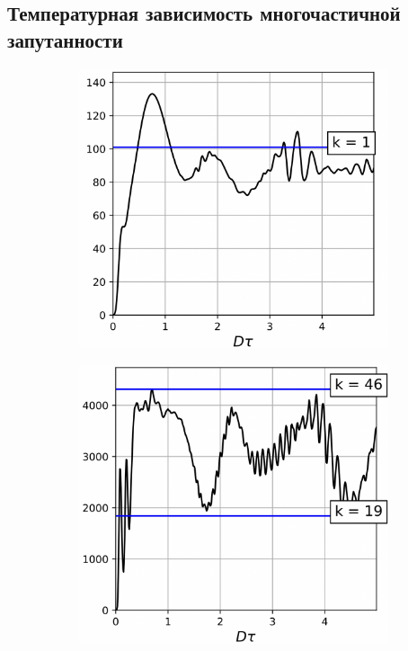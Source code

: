 \subsection{Температурная зависимость многочастичной запутанности}
\label{sec:5}

\begin{figure}[h]
  \centering
  \begin{subfigure}[t]{0.3\textwidth}
    \centering
    \includegraphics[width=\textwidth]{figures/result-nanopore-do-m2-by-time-n101-beta1.png}
    \caption{\protect}
    \label{fig:result-nanopore-do-m2-by-time-n101-beta1}
  \end{subfigure}
  \hfill
  \begin{subfigure}[t]{0.3\textwidth}
    \centering
    \includegraphics[width=\textwidth]{figures/result-nanopore-do-m2-by-time-n101-beta2.png}

\end{subfigure}
\end{figure}
